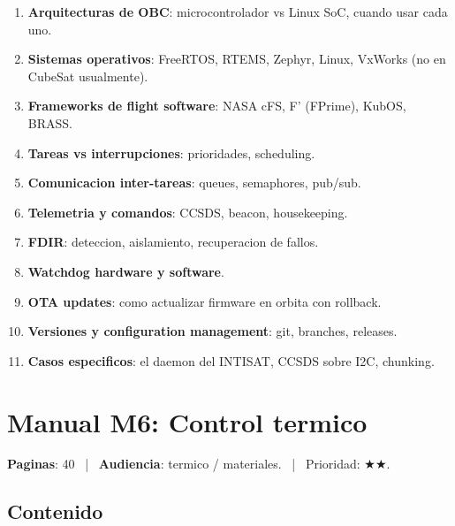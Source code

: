 \documentclass[11pt,a4paper,oneside]{report}
\begin{document}
\begin{enumerate}[leftmargin=2em]
  \item \textbf{Arquitecturas de OBC}: microcontrolador vs Linux SoC,
        cuando usar cada uno.
  \item \textbf{Sistemas operativos}: FreeRTOS, RTEMS, Zephyr, Linux,
        VxWorks (no en CubeSat usualmente).
  \item \textbf{Frameworks de flight software}: NASA cFS, F' (FPrime), KubOS,
        BRASS.
  \item \textbf{Tareas vs interrupciones}: prioridades, scheduling.
  \item \textbf{Comunicacion inter-tareas}: queues, semaphores, pub/sub.
  \item \textbf{Telemetria y comandos}: CCSDS, beacon, housekeeping.
  \item \textbf{FDIR}: deteccion, aislamiento, recuperacion de fallos.
  \item \textbf{Watchdog hardware y software}.
  \item \textbf{OTA updates}: como actualizar firmware en orbita con rollback.
  \item \textbf{Versiones y configuration management}: git, branches,
        releases.
  \item \textbf{Casos especificos}: el daemon del INTISAT, CCSDS sobre I2C,
        chunking.
\end{enumerate}

\chapter{Manual M6: Control termico}

\textbf{Paginas}: 40 ~|~ \textbf{Audiencia}: termico / materiales.
~|~ Prioridad: $\bigstar\bigstar$.

\section{Contenido}
\end{document}
